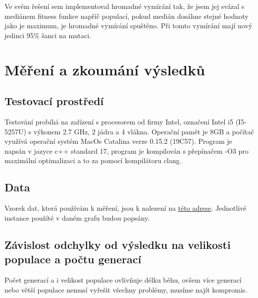 \documentclass{article}
\begin{document}
    Ve svém řešení sem implementoval hromadné vymírání tak, že jsem jej svázal s mediánem fitness funkce napříč populací, pokud medián dosáhne stejné hodnoty jako je maximum, je hromadné
    vymírání spuštěno. Při tomto vymírání mají nový jedinci 95\% šanci na mutaci.

    \pagebreak

    \section{Měření a zkoumání výsledků}

    \subsection{Testovací prostředí}

    Testování probíhá na zařízení s procesorem od firmy Intel, označení Intel i5 (I5-5257U) s výkonem 2.7 GHz, 2 jádra a 4 vlákna. Operační pamět je 8GB a počítač využívá
    operační systém MacOs Catalina verze 0.15.2 (19C57). Program je napsán v jazyce c++ standard 17, program je kompilován s přepínačem -O3 pro maximální optimalizaci a to za pomocí
    kompilátoru clang.

    \subsection{Data}

    Vzorek dat, která používám k měření, jsou k nalezení na \href{https://moodle-vyuka.cvut.cz/pluginfile.php/168161/mod_assign/intro/wuf-A.zip}{této adrese}. Jednotlivé instance
    použíté v daném grafu budou popsány.

    \subsection{Závislost odchylky od výsledku na velikosti populace a počtu generací}

    Počet generací a i velikost populace ovlivňuje délku běhu, ovšem více generací nebo větší populace nemusí vyřešit všechny problémy, musíme najít kompromis.
\end{document}
